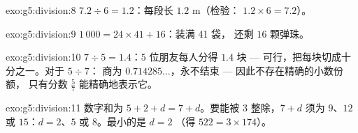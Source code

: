 \begin{solution}{exo:g5:division:8}
$7.2 \div 6 = 1.2$：每段长 $1.2$ m（检验：
$1.2 \times 6 = 7.2$）。
\end{solution}

\begin{solution}{exo:g5:division:9}
$1\,000 = 24 \times 41 + 16$：装满 41 袋，
还剩 $16$ 颗弹珠。
\end{solution}

\begin{solution}{exo:g5:division:10}
$7 \div 5 = 1.4$：$5$ 位朋友每人分得 $1.4$ 块 ---
可行，把每块切成十分之一。对于 $5 \div 7$：
商为 $0.714285\dots$，永不结束 --- 因此不存在精确的小数份额，
只有分数 $\frac57$ 能精确地表示它。
\end{solution}

\begin{solution}{exo:g5:division:11}
数字和为 $5 + 2 + d = 7 + d$。要能被 $3$ 整除，$7 + d$ 须为
$9$、$12$ 或 $15$：$d = 2$、$5$ 或 $8$。最小的是 $d = 2$
（得 $522 = 3 \times 174$）。
\end{solution}
